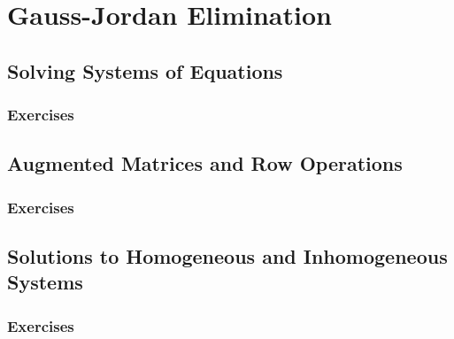 \section{Gauss-Jordan Elimination}
\subsection{Solving Systems of Equations}
\subsubsection{Exercises}


\subsection{Augmented Matrices and Row Operations}
\subsubsection{Exercises}


\subsection{Solutions to Homogeneous and Inhomogeneous Systems}
\subsubsection{Exercises}



